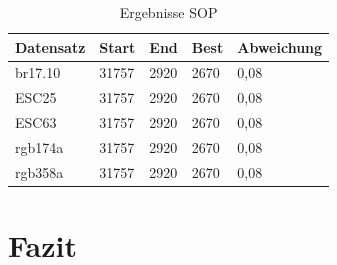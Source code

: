 \documentclass[conference]{IEEEtran}
\begin{document}
    \begin{table}[h]
      \label{SOP}
      \centering
      \begin{tabular}{|l|ll|l|l|}
      \hline
          Datensatz & \multicolumn{1}{l|}{Start} & End  & Best & Abweichung \\ \hline
          br17.10  & \multicolumn{1}{l|}{31757} & 2920 & 2670 & 0,08       \\ \hline
          ESC25  & \multicolumn{1}{l|}{31757} & 2920 & 2670 & 0,08       \\ \hline
          ESC63  & \multicolumn{1}{l|}{31757} & 2920 & 2670 & 0,08       \\ \hline
          rgb174a  & \multicolumn{1}{l|}{31757} & 2920 & 2670 & 0,08       \\ \hline
          rgb358a  & \multicolumn{1}{l|}{31757} & 2920 & 2670 & 0,08       \\ \hline
      \end{tabular}
      \caption[]{Ergebnisse SOP}
    \end{table}

  \section{Fazit}
\end{document}
